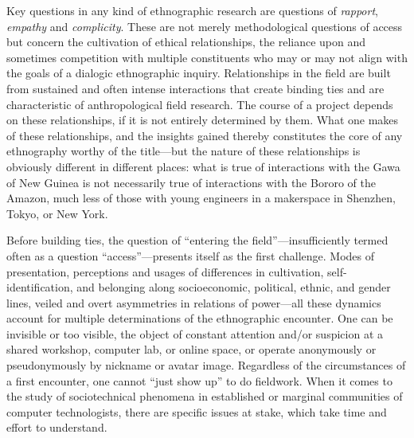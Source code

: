 \documentclass[10pt,letter,oneside]{scrartcl}
\begin{document}
Key questions in any kind of ethnographic research are questions of
\emph{rapport}, \emph{empathy} and \emph{complicity}.  These are not
merely methodological questions of access but concern the cultivation
of ethical relationships, the reliance upon and sometimes competition
with multiple constituents who may or may not align with the goals of
a dialogic ethnographic inquiry. Relationships in the field are built
from sustained and often intense interactions that create binding ties
and are characteristic of anthropological field research. The course
of a project depends on these relationships, if it is not entirely
determined by them.  What one makes of these relationships, and the
insights gained thereby constitutes the core of any ethnography worthy
of the title---but the nature of these relationships is obviously
different in different places: what is true of interactions with the
Gawa of New Guinea is not necessarily true of interactions with the
Bororo of the Amazon, much less of those with young engineers in a
makerspace in Shenzhen, Tokyo, or New York.

Before building ties, the question of ``entering the
field''---insufficiently termed often as a question ``access''---presents
itself as the first challenge.  Modes of presentation, perceptions and
usages of differences in cultivation, self-identification, and
belonging along socioeconomic, political, ethnic, and gender lines,
veiled and overt asymmetries in relations of power---all these dynamics
account for multiple determinations of the ethnographic encounter. One
can be invisible or too visible, the object of constant attention
and/or suspicion at a shared workshop, computer lab, or online space,
or operate anonymously or pseudonymously by nickname or avatar image.
Regardless of the circumstances of a first encounter, one cannot
``just show up'' to do fieldwork.  When it comes to the study
of sociotechnical phenomena in established or marginal communities of
computer technologists, there are specific issues at stake, which take
time and effort to understand.
  
\end{document}
